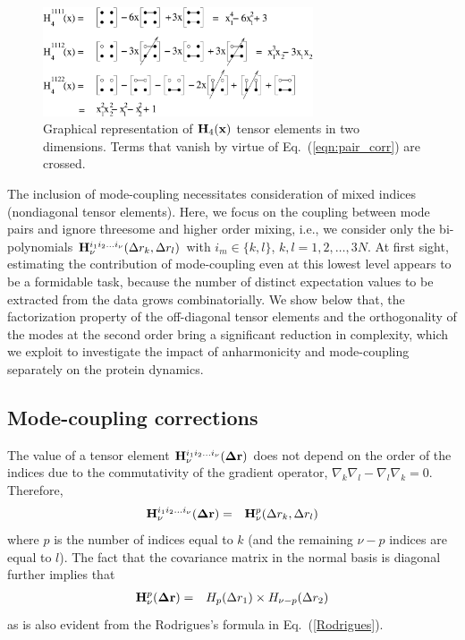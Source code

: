 \documentclass[12pt]{iopart}
\begin{document}
\begin{figure}[h!]
  \begin{center}
    \includegraphics[width=8cm]{./fig1.eps}
  \end{center}
\caption{Graphical representation of ${\bf H}_4({\bf x})$ tensor elements in two
dimensions. Terms that vanish by virtue of Eq.~(\ref{eqn:pair_corr})
are crossed.}
\label{Fig1}
\end{figure}


The inclusion of mode-coupling necessitates consideration of mixed
indices (nondiagonal tensor elements). Here, we focus on the coupling
between mode pairs and ignore threesome and higher order mixing, i.e.,
we consider only the bi-polynomials ${\bf H}^{i_1i_2\dots
i_\nu}_\nu(\Delta r_k,\Delta r_l)$ with $i_m \in \{k,l\}$,
$k,l=1,2,\dots,3N$. At first sight, estimating the contribution of
mode-coupling even at this lowest level appears to be a formidable
task, because the number of distinct expectation values to be
extracted from the data grows combinatorially. We show below that, the
factorization property of the off-diagonal tensor elements and the
orthogonality of the modes at the second order bring a significant
reduction in complexity, which we exploit to investigate the impact of
anharmonicity and mode-coupling separately on the protein dynamics.

\subsection{Mode-coupling corrections}
The value
of a tensor element ${\bf H}^{i_1i_2\dots i_\nu}_\nu({\bf \Delta r})$
does not depend on the order of the indices due to the commutativity
of the gradient operator, $\nabla_k\nabla_l -
\nabla_l\nabla_k=0$. Therefore,
\begin{eqnarray}
{\bf H}^{i_1i_2\dots i_\nu}_\nu({\bf \Delta r}) &=& {\bf H}^p_\nu(\Delta r_k,\Delta r_l) \nonumber
\end{eqnarray}
where $p$ is the number of indices equal to $k$ (and the remaining
$\nu-p$ indices are equal to $l$). The fact that the covariance matrix
in the normal basis is diagonal further implies that
\begin{eqnarray}
\label{factorization}
{\bf H}^p_\nu({\bf \Delta r}) &=& H_p(\Delta r_1)\times H_{\nu-p}(\Delta r_2)
\end{eqnarray}
as is also evident from the Rodrigues's formula in Eq.~(\ref{Rodrigues}).
\end{document}
